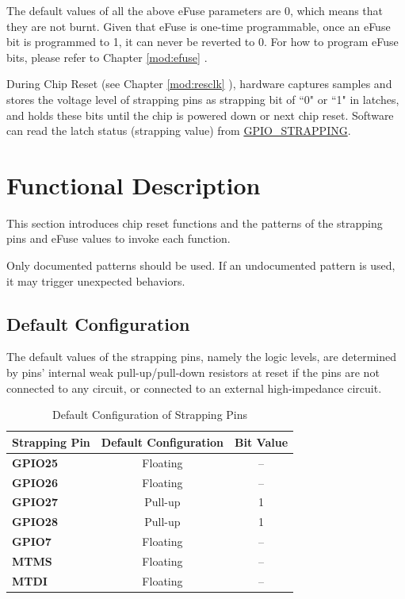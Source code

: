 \documentclass[main\_\_EN.tex]{subfiles}
\begin{document}
The default values of all the above eFuse parameters are 0, which means that they are not burnt. Given that eFuse is one-time programmable, once an eFuse bit is programmed to 1, it can never be reverted to 0. For how to program eFuse bits, please refer to Chapter \ref{mod:efuse} \textit{}.

During Chip Reset (see Chapter \ref{mod:resclk} \textit{}), hardware captures samples and stores the voltage level of strapping pins as strapping bit of ``0" or ``1" in latches, and holds these bits until the chip is powered down or next chip reset. Software can read the latch status (strapping value) from \hyperref[fielddesc:GPIOSTRAPPING]{GPIO\_STRAPPING}.

\section{Functional Description}

This section introduces chip reset functions and the patterns of the strapping pins and eFuse values to invoke each function.

\begin{importantlisting}
Only documented patterns should be used. If an undocumented pattern is used, it may trigger unexpected behaviors.
\end{importantlisting}

\subsection{Default Configuration}

The default values of the strapping pins, namely the logic levels, are determined by pins' internal weak pull-up/pull-down resistors at reset if the pins are not connected to any circuit, or connected to an external high-impedance circuit.

\begin{table}[H]
    \centering
    \caption{Default Configuration of Strapping Pins}
    \label{tab:bootctrl-default-config-strapping-pins}
    \begin{tabular}{ | l | c | c | }
    \hline
        \rowcolor{lightgray}
        \textbf{Strapping Pin} & \textbf{Default Configuration} & \textbf{Bit Value} \\\hline
        \textbf{GPIO25}  & Floating & -- \\ \hline
        \textbf{GPIO26}  & Floating & -- \\ \hline
        \textbf{GPIO27}  & Pull-up & 1 \\ \hline
        \textbf{GPIO28} & Pull-up & 1 \\ \hline
        \textbf{GPIO7}  & Floating & -- \\ \hline
        \textbf{MTMS}   & Floating & -- \\ \hline
        \textbf{MTDI}   & Floating & -- \\ \hline
    \end{tabular}
\end{table}
\end{document}
